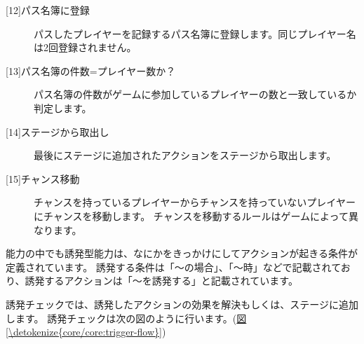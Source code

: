 \documentclass[letterpaper,10pt,dvipdfmx]{sphinxmanual}
\begin{document}
\begin{description}
\item[{{[}12{]}パス名簿に登録}] \leavevmode
パスしたプレイヤーを記録するパス名簿に登録します。同じプレイヤー名は2回登録されません。

\item[{{[}13{]}パス名簿の件数=プレイヤー数か？}] \leavevmode
パス名簿の件数がゲームに参加しているプレイヤーの数と一致しているか判定します。

\item[{{[}14{]}ステージから取出し}] \leavevmode
最後にステージに追加されたアクションをステージから取出します。

\item[{{[}15{]}チャンス移動}] \leavevmode
チャンスを持っているプレイヤーからチャンスを持っていないプレイヤーにチャンスを移動します。
チャンスを移動するルールはゲームによって異なります。

\end{description}
\label{\detokenize{core/core:trigger-check}}
能力の中でも誘発型能力は、なにかをきっかけにしてアクションが起きる条件が定義されています。
誘発する条件は「〜の場合」、「〜時」などで記載されており、誘発するアクションは「〜を誘発する」と記載されています。

誘発チェックでは、誘発したアクションの効果を解決もしくは、ステージに追加します。
誘発チェックは次の図のように行います。(\hyperref[\detokenize{core/core:trigger-flow}]{図 \ref{\detokenize{core/core:trigger-flow}}})
\end{document}
